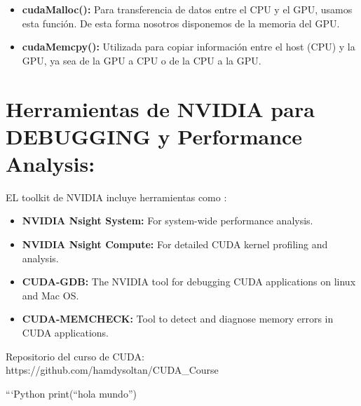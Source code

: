 \documentclass[
  letterpaper,
  DIV=11,
  numbers=noendperiod]{scrartcl}
\begin{document}
\begin{itemize}
\item
  \textbf{cudaMalloc():} Para transferencia de datos entre el CPU y el
  GPU, usamos esta función. De esta forma nosotros disponemos de la
  memoria del GPU.
\item
  \textbf{cudaMemcpy():} Utilizada para copiar información entre el host
  (CPU) y la GPU, ya sea de la GPU a CPU o de la CPU a la GPU.
\end{itemize}

\section{Herramientas de NVIDIA para DEBUGGING y Performance
Analysis:}\label{herramientas-de-nvidia-para-debugging-y-performance-analysis}

EL toolkit de NVIDIA incluye herramientas como :

\begin{itemize}
\item
  \textbf{NVIDIA Nsight System:} For system-wide performance analysis.
\item
  \textbf{NVIDIA Nsight Compute:} For detailed CUDA kernel profiling and
  analysis.
\item
  \textbf{CUDA-GDB:} The NVIDIA tool for debugging CUDA applications on
  linux and Mac OS.
\item
  \textbf{CUDA-MEMCHECK:} Tool to detect and diagnose memory errors in
  CUDA applications.
\end{itemize}

Repositorio del curso de CUDA:\\
https://github.com/hamdysoltan/CUDA\_Course

```Python print(``hola mundo'')
\end{document}
